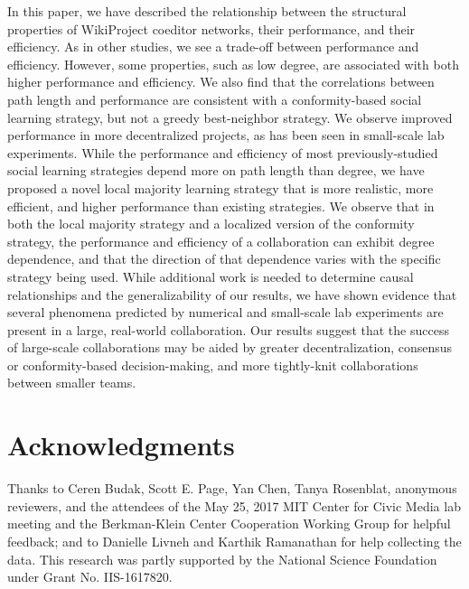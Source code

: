 In this paper, we have described the relationship between the structural properties of WikiProject
coeditor networks, their performance, and their efficiency.
As in other studies, we see a trade-off between performance and efficiency. However, 
some properties, such as low degree, are associated with both higher performance and efficiency.
We also find that the correlations between path length and performance are consistent with a conformity-based
social learning strategy, but not a greedy best-neighbor strategy.
We observe improved performance in more decentralized projects, as has been seen in small-scale lab experiments.
While the performance and efficiency of most previously-studied social learning strategies depend more on path length than
degree,
we have proposed a novel local majority learning strategy that is more realistic, more efficient, and higher performance than
existing strategies.
We observe that in both the local majority strategy and a localized version of
the conformity strategy,
the performance and efficiency of a collaboration can exhibit degree dependence,
and that the direction of that dependence varies with the specific strategy being used.
While additional work is needed to determine causal relationships
and the generalizability of our results,
we have shown evidence that several phenomena predicted by numerical
and small-scale lab experiments are present in a large,
real-world collaboration.
Our results suggest that the success of large-scale collaborations may be aided
by greater decentralization,
consensus or conformity-based decision-making,
and more tightly-knit collaborations between smaller teams.

\section{Acknowledgments}
Thanks to
Ceren Budak, Scott E. Page, Yan Chen, Tanya Rosenblat,
anonymous reviewers,
and the attendees of the May 25, 2017 MIT Center for Civic Media lab meeting
and the Berkman-Klein Center Cooperation Working Group for helpful feedback;
and to Danielle Livneh and Karthik Ramanathan for help collecting the data.
This research was partly supported by the National Science Foundation under Grant No. IIS-1617820.
